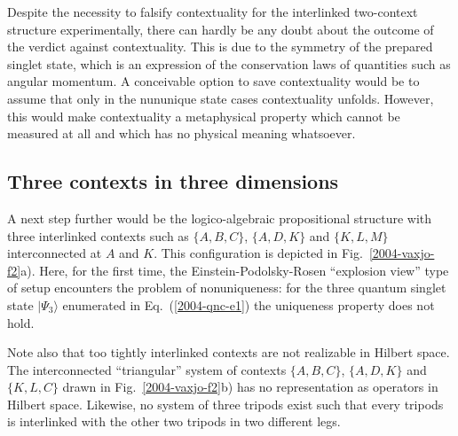 \documentclass{aipproc}
\begin{document}
Despite the necessity to falsify contextuality for the interlinked two-context structure experimentally,
there can hardly be any doubt about the outcome of the verdict against contextuality.
This is due to the symmetry of the prepared singlet state,
which is an expression of the conservation laws of quantities such as angular momentum.
A conceivable option to save contextuality would be to assume that only in the nununique state cases
contextuality unfolds.
However, this would make contextuality a metaphysical property which cannot be measured at all
and which has no physical meaning whatsoever.

\subsection{Three contexts in three dimensions}

A next step further would be the logico-algebraic propositional structure
with three interlinked contexts such as
$\{A,B,C\}$,
$\{A,D,K\}$
and
$\{K,L,M\}$ interconnected at $A$ and $K$.
This configuration is depicted in Fig.~\ref{2004-vaxjo-f2}a).
Here, for the first time, the Einstein-Podolsky-Rosen ``explosion view'' type of setup
encounters the problem of nonuniqueness:
for the three quantum singlet state
$
\vert \Psi_3 \rangle
$
enumerated in
Eq.~(\ref{2004-qnc-e1})
the uniqueness property does not hold.

Note also that too tightly interlinked contexts are not realizable in Hilbert space.
The interconnected ``triangular'' system of contexts
$\{A,B,C\}$,
$\{A,D,K\}$
and
$\{K,L,C\}$  drawn in Fig.~\ref{2004-vaxjo-f2}b)
has no representation as operators in Hilbert space.
Likewise, no system of three tripods exist such that every tripods is interlinked
with the other two tripods in two different legs.
\end{document}
